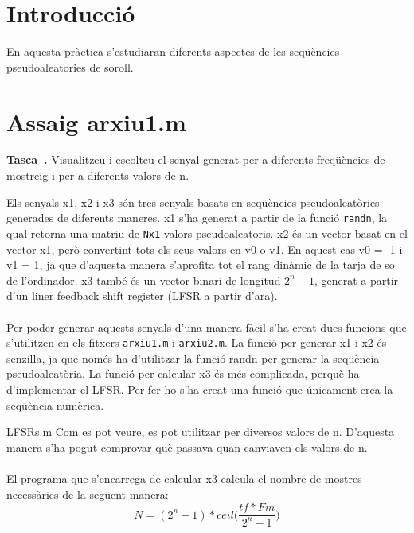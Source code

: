 \documentclass[11pt]{report}
\newcounter{previCounter}
\newenvironment{enunciat}{
  \stepcounter{previCounter}
  \par\vspace{\baselineskip}\noindent
  {\bf Tasca~\thepreviCounter.}}{\par\medskip\ignorespacesafterend}
\begin{document}
\section*{Introducció}
En aquesta pràctica s'estudiaran diferents aspectes de les seqüències pseudoaleatories de soroll.



\section*{Assaig arxiu1.m}
\begin{enunciat}
     Visualitzeu i escolteu el senyal generat per a diferents freqüències de mostreig i per a diferents valors de n.
\end{enunciat}
Els senyals x1, x2 i x3 són tres senyals basats en seqüències pseudoaleatòries generades de diferents maneres.
x1 s'ha generat a partir de la funció \texttt{randn}, la qual retorna una matriu de \texttt{Nx1} valors pseudoaleatoris.
x2 és un vector basat en el vector x1, però convertint tots els seus valors en v0 o v1. En aquest cas v0 = -1 i v1 = 1, ja que d'aquesta manera s'aprofita tot el rang dinàmic de la tarja de so de l'ordinador.
x3 també és un vector binari de longitud ${2^n-1}$, generat a partir d'un liner feedback shift register (LFSR a partir d'ara).
\paragraph{}
Per poder generar aquests senyals d'una manera fàcil s'ha creat dues funcions que s'utilitzen en els fitxers \texttt{arxiu1.m} i \texttt{arxiu2.m}.
La funció per generar x1 i x2 és senzilla, ja que només ha d'utilitzar la funció randn per generar la seqüència pseudoaleatòria.
La funció per calcular x3 és més complicada, perquè ha d'implementar el LFSR. Per fer-ho s'ha creat una funció que únicament crea la seqüència numèrica.

 {LFSRs.m}
Com es pot veure, es pot utilitzar per diversos valors de n. D'aquesta manera s'ha pogut comprovar què passava quan canviaven els valors de n.
\paragraph{}
El programa que s'encarrega de calcular x3 calcula el nombre de mostres necessàries de la següent manera:
\begin{equation}
     N = (2^{n} - 1) * ceil\Big(\frac{tf * Fm}{2^{n} - 1}\Big)
\end{equation}
\end{document}
